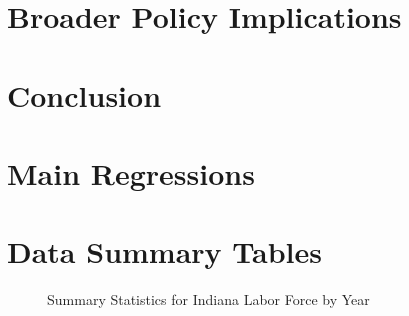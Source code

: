 \documentclass[12pt, letterpaper, leqno]{article}
\begin{document}
\section{Broader Policy Implications} %
\label{sec:policy_implications}


\section{Conclusion} %
\label{sec:conclusion}





\nocite{*} %
%
\begin{appendices}
\appendixpage
\appendix
{}
\section{Main Regressions}

\section{Data Summary Tables}

\newpage
\begin{figure}[H]
    \caption{Summary Statistics for Indiana Labor Force by Year}
    \vspace{-6mm}
    
	\vspace{-6mm}
\end{figure}



\end{appendices}
\end{document}
